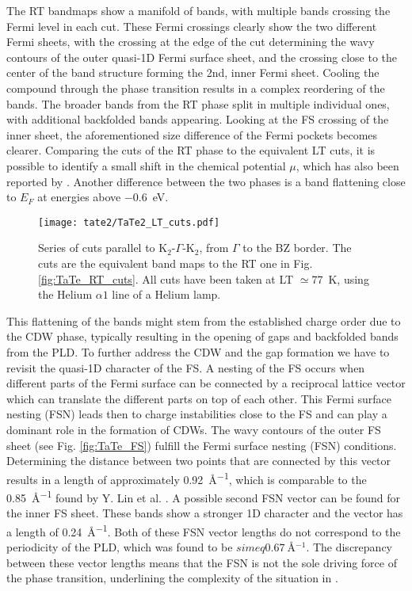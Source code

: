 The RT bandmaps show a manifold of bands, with multiple bands crossing the Fermi level in each cut.
These Fermi crossings clearly show the two different Fermi sheets, with the crossing at the edge of the cut determining the wavy contours of the outer quasi-1D Fermi surface sheet, and the crossing close to the center of the band structure forming the 2nd, inner Fermi sheet.
Cooling the compound through the phase transition results in a complex reordering of the bands.
The broader bands from the RT phase split in multiple individual ones, with additional backfolded bands appearing.
Looking at the FS crossing of the inner sheet, the aforementioned size difference of the Fermi pockets becomes clearer.
Comparing the cuts of the RT phase to the equivalent LT cuts, it is possible to identify a small shift in the chemical potential $\mu$, which has also been reported by \cite{mitsuishi_unveiling_2024}.
Another difference between the two phases is a band flattening close to $E_F$ at energies above \qty{-0.6}{\electronvolt}.

\begin{figure}[h]
	\centering
	\texttt{[image: tate2/TaTe2\_LT\_cuts.pdf]}
	\caption{Series of cuts parallel to K$_2$-$\Gamma$-K$_2$, from $\Gamma$ to the BZ border. The cuts are the equivalent band maps to the RT one in Fig. \ref{fig:TaTe_RT_cuts}. All cuts have been taken at LT $\simeq$\qty{77}{\kelvin}, using the Helium $\alpha1$ line of a Helium lamp.}
	\label{fig:TaTe_LT_cuts}
\end{figure}

This flattening of the bands might stem from the established charge order due to the CDW phase, typically resulting in the opening of gaps and backfolded bands from the PLD.
To further address the CDW and the gap formation we have to revisit the quasi-1D character of the FS.
A nesting of the FS occurs when different parts of the Fermi surface can be connected by a reciprocal lattice vector which can translate the different parts on top of each other.
This Fermi surface nesting (FSN) leads then to charge instabilities close to the FS and can play a dominant role in the formation of CDWs.
The wavy contours of the outer FS sheet (see Fig. \ref{fig:TaTe_FS}) fulfill the Fermi surface nesting (FSN) conditions.
Determining the distance between two points that are connected by this vector results in a length of approximately \qty{0.92}{\angstrom^{-1}}, which is comparable to the \qty{0.85}{\angstrom^{-1}} found by Y. Lin et al. \cite{lin_evidence_2022}.
A possible second FSN vector can be found for the inner FS sheet.
These bands show a stronger 1D character and the vector has a length of \qty{0.24}{\angstrom^{-1}}.
Both of these FSN vector lengths do not correspond to the periodicity of the PLD, which was found to be $simeq\qty{0.67}{\angstrom^{-1}}$.
The discrepancy between these vector lengths means that the FSN is not the sole driving force of the phase transition, underlining the complexity of the situation in .

